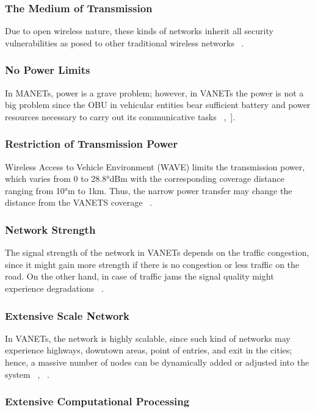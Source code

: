 \documentclass[
  oneside,
  11pt, a4paper,
  footinclude=true,
  headinclude=true,
  cleardoublepage=empty
]{scrbook}
\begin{document}
\subsubsection{The Medium of Transmission}

Due to open wireless nature, these kinds of networks inherit all security vulnerabilities as posed to other traditional wireless networks ~\cite{vanets}.

\subsubsection{No Power Limits}

In MANETs, power is a grave problem; however, in VANETs the power is not a big problem since the OBU in vehicular entities bear sufficient battery and power resources necessary to carry out its communicative tasks ~\cite{vanet3},~\cite{vanet2}].

\subsubsection{Restriction of Transmission Power}
Wireless Access to Vehicle Environment (WAVE) limits the transmission power, which varies from 0 to 28.8°dBm with the corresponding coverage distance ranging from 10°m to 1km. Thus, the narrow power transfer may change the distance from the VANETS coverage ~\cite{vanet2}.


\subsubsection{Network Strength}
The signal strength of the network in VANETs depends on the traffic congestion, since it might gain more strength if there is no congestion or less traffic on the road. On the other hand, in case of traffic jams the signal quality might experience degradations ~\cite{vanet2}.

\subsubsection{Extensive Scale Network}
In VANETs, the network is highly scalable, since such kind of networks may experience highways, downtown areas, point of entries, and exit in the cities; hence, a massive number of nodes can be dynamically added or adjusted into the system ~\cite{vanet3}, ~\cite{vanetusarlater}.

\subsubsection{Extensive Computational Processing}
\end{document}
